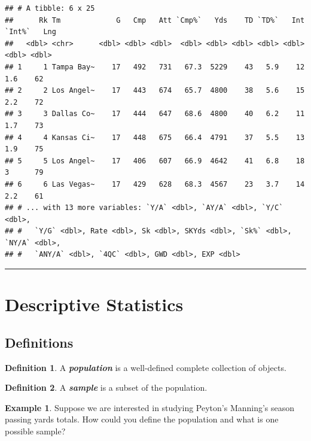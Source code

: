 \documentclass[
  11pt,
]{book}
\theoremstyle{definition}
\newtheorem{definition}{Definition}[chapter]
\theoremstyle{definition}
\newtheorem{example}{Example}[chapter]
\theoremstyle{definition}
\theoremstyle{definition}
\theoremstyle{remark}
\begin{document}
\begin{verbatim}
## # A tibble: 6 x 25
##      Rk Tm             G   Cmp   Att `Cmp%`   Yds    TD `TD%`   Int `Int%`   Lng
##   <dbl> <chr>      <dbl> <dbl> <dbl>  <dbl> <dbl> <dbl> <dbl> <dbl>  <dbl> <dbl>
## 1     1 Tampa Bay~    17   492   731   67.3  5229    43   5.9    12    1.6    62
## 2     2 Los Angel~    17   443   674   65.7  4800    38   5.6    15    2.2    72
## 3     3 Dallas Co~    17   444   647   68.6  4800    40   6.2    11    1.7    73
## 4     4 Kansas Ci~    17   448   675   66.4  4791    37   5.5    13    1.9    75
## 5     5 Los Angel~    17   406   607   66.9  4642    41   6.8    18    3      79
## 6     6 Las Vegas~    17   429   628   68.3  4567    23   3.7    14    2.2    61
## # ... with 13 more variables: `Y/A` <dbl>, `AY/A` <dbl>, `Y/C` <dbl>,
## #   `Y/G` <dbl>, Rate <dbl>, Sk <dbl>, SKYds <dbl>, `Sk%` <dbl>, `NY/A` <dbl>,
## #   `ANY/A` <dbl>, `4QC` <dbl>, GWD <dbl>, EXP <dbl>
\end{verbatim}

\begin{center}\rule{0.5\linewidth}{0.5pt}\end{center}

\hypertarget{descriptive-statistics}{%
\section{Descriptive Statistics}\label{descriptive-statistics}}

\hypertarget{definitions}{%
\subsection{Definitions}\label{definitions}}

\begin{definition}
A \textbf{\emph{population}} is a well-defined complete collection of objects.
\end{definition}

\begin{definition}
A \textbf{\emph{sample}} is a subset of the population.
\end{definition}

\begin{example}
Suppose we are interested in studying Peyton's Manning's season passing yards totals. How could you define the population and what is one possible sample?
\end{example}

\hfill\break
\hfill\break
\hfill\break
\hfill\break
\hfill\break
\end{document}
